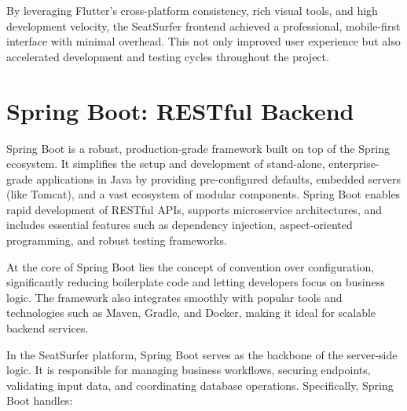 \documentclass[12pt,a4paper]{report}
\begin{document}
By leveraging Flutter's cross-platform consistency, rich visual tools, and high development velocity, the SeatSurfer frontend achieved a professional, mobile-first interface with minimal overhead. This not only improved user experience but also accelerated development and testing cycles throughout the project.

\section{Spring Boot: RESTful Backend}

Spring Boot is a robust, production-grade framework built on top of the Spring ecosystem. It simplifies the setup and development of stand-alone, enterprise-grade applications in Java by providing pre-configured defaults, embedded servers (like Tomcat), and a vast ecosystem of modular components. Spring Boot enables rapid development of RESTful APIs, supports microservice architectures, and includes essential features such as dependency injection, aspect-oriented programming, and robust testing frameworks.

At the core of Spring Boot lies the concept of convention over configuration, significantly reducing boilerplate code and letting developers focus on business logic. The framework also integrates smoothly with popular tools and technologies such as Maven, Gradle, and Docker, making it ideal for scalable backend services.

In the SeatSurfer platform, Spring Boot serves as the backbone of the server-side logic. It is responsible for managing business workflows, securing endpoints, validating input data, and coordinating database operations. Specifically, Spring Boot handles:
\end{document}
